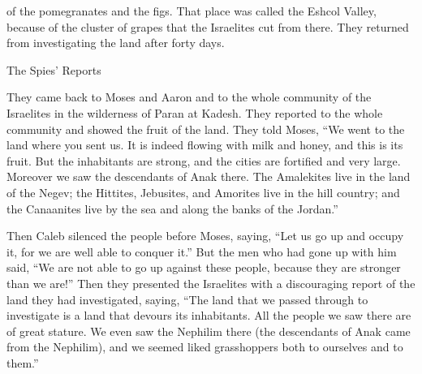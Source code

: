 {of the pomegranates
and the figs.
That place
was
called
the Eshcol
Valley,
because
of the cluster
of grapes that
the Israelites
cut
from there.
They returned
from investigating
the land
after
forty
days.
\par }{\SH The Spies’ Reports
\par }{\PP {}They came
back to
Moses
and Aaron
and to
the whole
community
of the Israelites
in the wilderness
of Paran
at Kadesh.
They reported
to the
whole
community
and showed
the
fruit
of the land.
They told
Moses, “We went
to
the land
where
you sent
us. It is
indeed
flowing
with milk
and honey,
and this
is its fruit.
But
the inhabitants
are strong,
and the cities
are fortified
and very
large.
Moreover
we saw
the descendants
of Anak
there.
The Amalekites
live
in the land
of the Negev;
the Hittites,
Jebusites,
and Amorites
live
in the hill country;
and the Canaanites
live
by
the sea
and along the banks
of the Jordan.”
\par }{\PP {}Then Caleb
silenced
the people
before
Moses,
saying,
“Let us go
up
and occupy
it, for
we
are well able to conquer it.”
But the men
who had
gone up
with
him said,
“We are not
able
to go up
against these people,
because
they are stronger
than we are!”
Then they presented
the Israelites
with a discouraging report
of the land
they had
investigated,
saying,
“The land
that
we passed through
to investigate
is a land
that devours
its inhabitants.
All
the people
we saw
there are of great stature.
We even saw
the Nephilim
there
(the descendants
of Anak
came from
the Nephilim), and we seemed
liked
grasshoppers both to ourselves and to them.”


}
